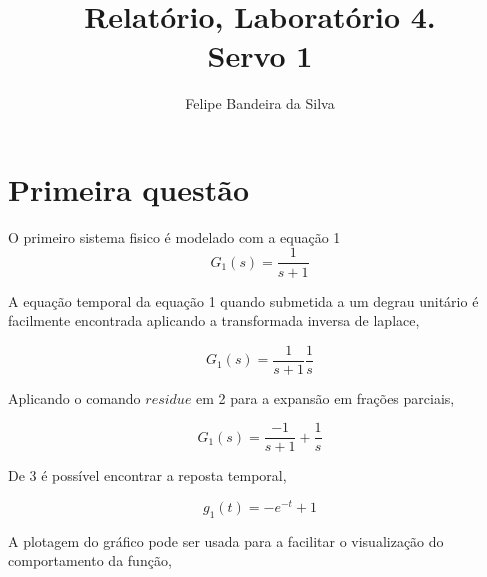 \documentclass[paper=a4, fontsize=11pt]{article}
\title{Relatório, Laboratório 4.\\Servo 1}
\author{Felipe Bandeira da Silva}
\begin{document}






\newpage

\section{Primeira questão}

O primeiro sistema fisico é modelado com a equação 1
\begin{equation}
    G_1(s) = \frac{1}{s+1}
\end{equation}

A equação temporal da equação 1 quando submetida a um degrau unitário
é facilmente encontrada aplicando a transformada inversa de laplace,

\begin{equation}
    G_1(s) = \frac{1}{s+1} \frac{1}{s}
\end{equation}

Aplicando o comando $residue$ em 2 para a expansão em frações parciais,

\begin{equation}
    G_1(s) = \frac{-1}{s+1} + \frac{1}{s}
\end{equation}

De 3 é possível encontrar a reposta temporal,

\begin{equation}
    g_1(t) = -e^{-t} + 1
\end{equation}

A plotagem do gráfico pode ser usada para a facilitar o visualização
do comportamento da função,
\end{document}
